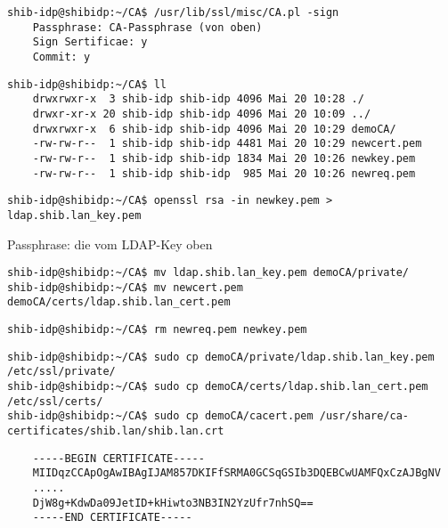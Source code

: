 \begin{lstlisting}
shib-idp@shibidp:~/CA$ /usr/lib/ssl/misc/CA.pl -sign
	Passphrase: CA-Passphrase (von oben)
	Sign Sertificae: y
	Commit: y
\end{lstlisting}
\begin{lstlisting}
shib-idp@shibidp:~/CA$ ll
	drwxrwxr-x  3 shib-idp shib-idp 4096 Mai 20 10:28 ./
	drwxr-xr-x 20 shib-idp shib-idp 4096 Mai 20 10:09 ../
	drwxrwxr-x  6 shib-idp shib-idp 4096 Mai 20 10:29 demoCA/
	-rw-rw-r--  1 shib-idp shib-idp 4481 Mai 20 10:29 newcert.pem
	-rw-rw-r--  1 shib-idp shib-idp 1834 Mai 20 10:26 newkey.pem
	-rw-rw-r--  1 shib-idp shib-idp  985 Mai 20 10:26 newreq.pem
\end{lstlisting}
\begin{lstlisting}
shib-idp@shibidp:~/CA$ openssl rsa -in newkey.pem > ldap.shib.lan_key.pem 
\end{lstlisting}
Passphrase: die vom LDAP-Key oben\newline
{}
\begin{lstlisting}
shib-idp@shibidp:~/CA$ mv ldap.shib.lan_key.pem demoCA/private/
shib-idp@shibidp:~/CA$ mv newcert.pem demoCA/certs/ldap.shib.lan_cert.pem
\end{lstlisting}
\begin{lstlisting}
shib-idp@shibidp:~/CA$ rm newreq.pem newkey.pem 
\end{lstlisting}
\begin{lstlisting}
shib-idp@shibidp:~/CA$ sudo cp demoCA/private/ldap.shib.lan_key.pem /etc/ssl/private/
shib-idp@shibidp:~/CA$ sudo cp demoCA/certs/ldap.shib.lan_cert.pem /etc/ssl/certs/
shib-idp@shibidp:~/CA$ sudo cp demoCA/cacert.pem /usr/share/ca-certificates/shib.lan/shib.lan.crt
\end{lstlisting}

\begin{lstlisting}
	-----BEGIN CERTIFICATE-----
	MIIDqzCCApOgAwIBAgIJAM857DKIFfSRMA0GCSqGSIb3DQEBCwUAMFQxCzAJBgNV
	.....
	DjW8g+KdwDa09JetID+kHiwto3NB3IN2YzUfr7nhSQ==
	-----END CERTIFICATE-----
\end{lstlisting}


